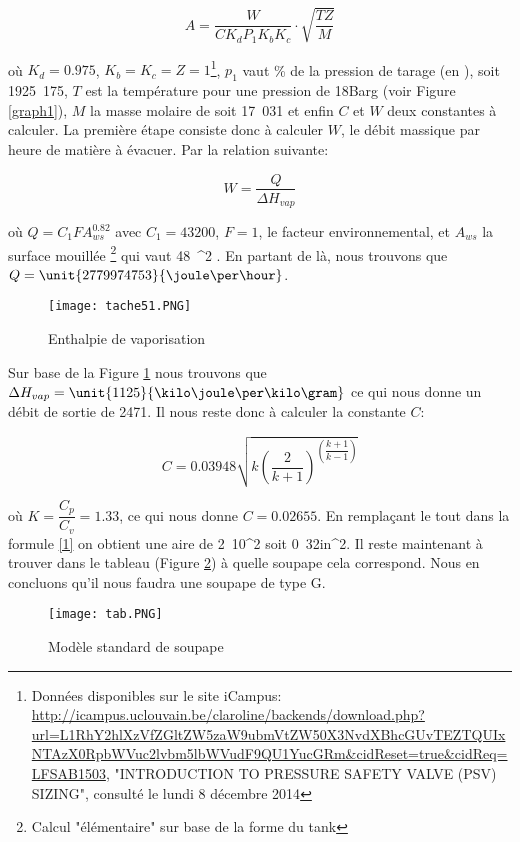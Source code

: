 \begin{equation}
A=\dfrac{W}{CK_dP_1K_bK_c}\cdot \sqrt{\dfrac{TZ}{M}}
\label{1}
\end{equation}

où $K_d=0.975$, $K_b=K_c=Z=1$\footnote{Données disponibles sur le site iCampus: \url{http://icampus.uclouvain.be/claroline/backends/download.php?url=L1RhY2hlXzVfZGltZW5zaW9ubmVtZW50X3NvdXBhcGUvTEZTQUIxNTAzX0RpbWVuc2lvbm5lbWVudF9QU1YucGRm&cidReset=true&cidReq=LFSAB1503}, "INTRODUCTION TO PRESSURE SAFETY VALVE (PSV) SIZING", consulté le lundi 8 décembre 2014}, $p_1$ vaut  \% de la pression de tarage (en \bbar), soit \unit{1925.175}{\kilo \pascal}, $T$ est la température pour une pression de \unit{18}{Barg} (voir Figure \ref{graph1}), $M$ la masse molaire de  soit \unit{17.031}{\gram \per \mole} et enfin $C$ et $W$ deux constantes à calculer. La première étape consiste donc à calculer $W$, le débit massique par heure de matière à évacuer. Par la relation suivante:

$$W=\dfrac{Q}{\Delta H_{vap}}$$

où $Q=C_1FA_{ws}^{0.82}$ avec $C_1=43200$, $F=1$, le facteur environnemental, et $A_ {ws}$ la surface mouillée \footnote{Calcul "élémentaire" sur base de la forme du tank} qui vaut \unit{48\pi}{\meter ^2} . En partant de là, nous trouvons que $Q=\unit{2779974753}{\joule \per \hour}$.

\begin{figure}[ht!]
\centering
\texttt{[image: tache51.PNG]}
\caption{Enthalpie de vaporisation}
\label{graph2}
\end{figure}

Sur base de la Figure \ref{graph2} nous trouvons que $\Delta H_{vap}=\unit{1125}{\kilo \joule \per \kilo \gram}$ ce qui nous donne un débit de sortie de \unit{2471}{\kilo \gram \per \hour}.
Il nous reste donc à calculer la constante $C$:

$$C=0.03948\sqrt{k\left( \dfrac{2}{k+1}\right)^{\left( \dfrac{k+1}{k-1}\right)}}$$

où $K=\dfrac{C_p}{C_v}=1.33$, ce qui nous donne $C=0.02655$. En remplaçant le tout dans la formule \ref{1} on obtient une aire de \unit{2.10}{\centi \metre^2} soit \unit{0.32}{in^2}. Il reste maintenant à trouver dans le tableau (Figure \ref{tab}) à quelle soupape cela correspond. Nous en concluons qu'il nous faudra une soupape de type G.

\begin{figure}[ht!]
\centering
\texttt{[image: tab.PNG]}
\caption{Modèle standard de soupape}
\label{tab}
\end{figure}

